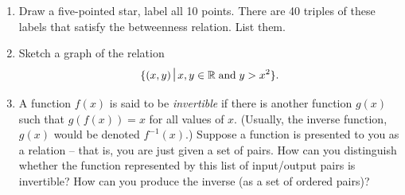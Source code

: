 \begin{enumerate}
\vfill


\vfill

\hintspagebreak
\workbookpagebreak

\item Draw a five-pointed star, label all 10 points.  There are 40 triples of these 
labels that satisfy the betweenness relation.  List them.

\vfill


\workbookpagebreak

\item Sketch a graph of the relation 
\[
\{ (x,y) \suchthat x,y \in \Reals \; \mbox{and} \; y > x^2 \}.
\]


\wbvfill

\item A function $f(x)$ is said to be  
\emph{invertible} if there is another function $g(x)$ such that 
$g(f(x)) = x$ for all values of $x$.  (Usually, the inverse function,
$g(x)$ would be denoted $f^{-1}(x)$.)   Suppose a function is presented 
to you as a relation -- that is, you are just given a set of pairs.  
How can you distinguish whether the function represented by this list 
of input/output pairs is invertible?  How can you produce the inverse 
(as a set of ordered pairs)?
 

\end{enumerate}
